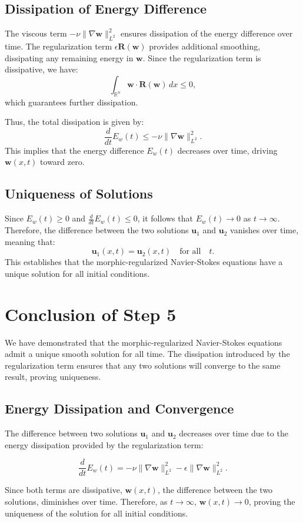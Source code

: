 \documentclass{article}
\begin{document}
\subsection*{Dissipation of Energy Difference}

The viscous term \( - \nu \|\nabla \mathbf{w}\|_{L^2}^2 \) ensures dissipation of the energy difference over time. The regularization term \( \epsilon \mathbf{R}(\mathbf{w}) \) provides additional smoothing, dissipating any remaining energy in \( \mathbf{w} \). Since the regularization term is dissipative, we have:
\[
\int_{\mathbb{R}^n} \mathbf{w} \cdot \mathbf{R}(\mathbf{w}) \, dx \leq 0,
\]
which guarantees further dissipation.

Thus, the total dissipation is given by:
\[
\frac{d}{dt} E_w(t) \leq - \nu \|\nabla \mathbf{w}\|_{L^2}^2.
\]
This implies that the energy difference \( E_w(t) \) decreases over time, driving \( \mathbf{w}(x,t) \) toward zero.

\subsection*{Uniqueness of Solutions}

Since \( E_w(t) \geq 0 \) and \( \frac{d}{dt} E_w(t) \leq 0 \), it follows that \( E_w(t) \to 0 \) as \( t \to \infty \). Therefore, the difference between the two solutions \( \mathbf{u}_1 \) and \( \mathbf{u}_2 \) vanishes over time, meaning that:
\[
\mathbf{u}_1(x,t) = \mathbf{u}_2(x,t) \quad \text{for all} \quad t.
\]
This establishes that the morphic-regularized Navier-Stokes equations have a unique solution for all initial conditions.

\section{Conclusion of Step 5}

We have demonstrated that the morphic-regularized Navier-Stokes equations admit a unique smooth solution for all time. The dissipation introduced by the regularization term ensures that any two solutions will converge to the same result, proving uniqueness.
\subsection*{Energy Dissipation and Convergence}

The difference between two solutions \( \mathbf{u}_1 \) and \( \mathbf{u}_2 \) decreases over time due to the energy dissipation provided by the regularization term:

\[
\frac{d}{dt} E_w(t) = - \nu \|\nabla \mathbf{w}\|_{L^2}^2 - \epsilon \|\nabla \mathbf{w}\|_{L^2}^2.
\]

Since both terms are dissipative, \( \mathbf{w}(x,t) \), the difference between the two solutions, diminishes over time. Therefore, as \( t \to \infty \), \( \mathbf{w}(x,t) \to 0 \), proving the uniqueness of the solution for all initial conditions.
\end{document}
